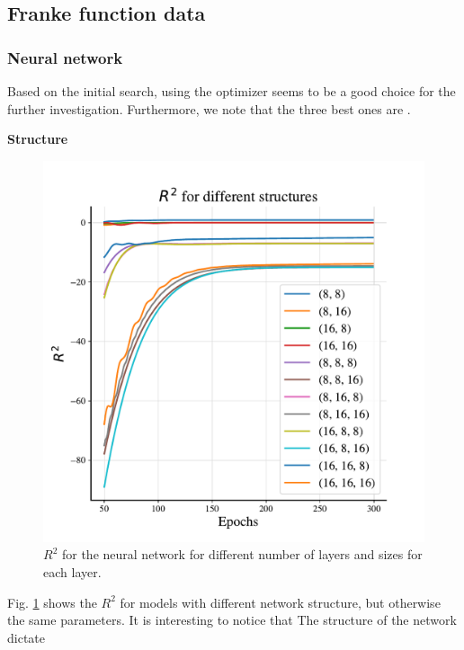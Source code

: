 \subsection{Franke function data}


\subsubsection{Neural network}

Based on the initial search, using the  optimizer seems to be a good choice for the further investigation.
Furthermore, we note that the three best ones are . 

\textbf{Structure}

\begin{figure}
    \centering
    \includegraphics[width=1.0\linewidth]{project_2/figures/$R^2$ for different structures_continuous.pdf}
    \caption{$R^2$ for the neural network for different number of layers and sizes for each layer.}
    \label{fig:structure_franke}
\end{figure}

Fig. \ref{fig:structure_franke} shows the $R^2$ for models with different network structure, but otherwise the same parameters. It is interesting to notice that 
The structure of the network dictate 

